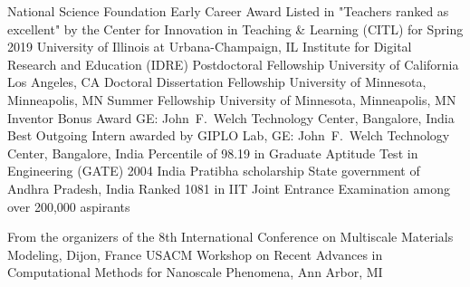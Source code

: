 \documentclass[numbers]{cv}
\begin{document}
\begin{researchinterests}
\end{researchinterests}




\begin{honors}
  {National Science Foundation Early Career Award}
  {Listed in "Teachers ranked as excellent" by the Center for Innovation in
  Teaching \& Learning (CITL) for Spring 2019}
  {University of Illinois at Urbana-Champaign, IL}
  {Institute for Digital Research and Education (IDRE) Postdoctoral Fellowship }
  {University of California Los Angeles, CA}
  {Doctoral Dissertation Fellowship}
  {University of Minnesota, Minneapolis, MN}
  {Summer Fellowship}
  {University of Minnesota, Minneapolis, MN}
  {Inventor Bonus Award}
  {GE: John~F.~Welch Technology Center, Bangalore, India}
  {Best Outgoing Intern}
  {awarded by GIPLO Lab, GE: John~F.~Welch Technology Center, Bangalore, India}
  {Percentile of 98.19 in Graduate Aptitude Test in Engineering (GATE) 2004}
  {India}
  {Pratibha scholarship}%
  {State government of Andhra Pradesh, India}
  {Ranked 1081 in IIT Joint Entrance Examination among over 200,000 aspirants}%
  {}
\end{honors}

\begin{travelgrant}
    {From the organizers of the 8th International Conference on Multiscale Materials Modeling, Dijon, France}
    {}
    {USACM Workshop on Recent Advances in Computational Methods for Nanoscale
    Phenomena, Ann Arbor, MI}
    {}
\end{travelgrant}
\end{document}
